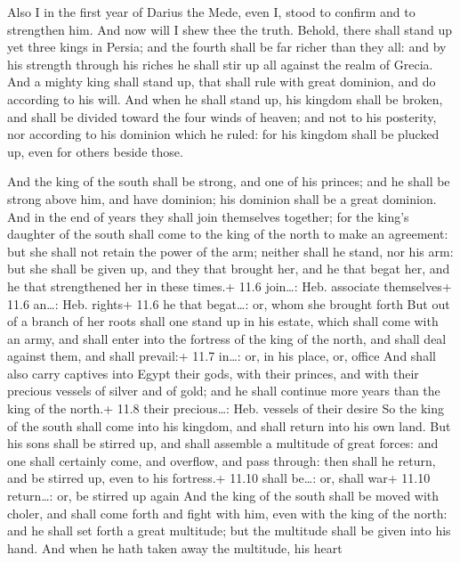 Also I in the first year of Darius the Mede, even I, stood
to confirm and to strengthen him.  And now will I shew thee
the truth. Behold, there shall stand up yet three kings in Persia; and
the fourth shall be far richer than they all: and by his strength
through his riches he shall stir up all against the realm of Grecia.
 And a mighty king shall stand up, that shall rule with
great dominion, and do according to his will.  And when he
shall stand up, his kingdom shall be broken, and shall be divided toward
the four winds of heaven; and not to his posterity, nor according to his
dominion which he ruled: for his kingdom shall be plucked up, even for
others beside those.

 And the king of the south shall be strong, and one of his
princes; and he shall be strong above him, and have dominion; his
dominion shall be a great dominion.  And in the end of years
they shall join themselves together; for the king's daughter of the
south shall come to the king of the north to make an agreement: but she
shall not retain the power of the arm; neither shall he stand, nor his
arm: but she shall be given up, and they that brought her, and he that
begat her, and he that strengthened her in these times.+ 11.6
join\ldots: Heb. associate themselves+ 11.6 an\ldots: Heb. rights+ 11.6
he that begat\ldots: or, whom she brought forth  But out of
a branch of her roots shall one stand up in his estate, which shall come
with an army, and shall enter into the fortress of the king of the
north, and shall deal against them, and shall prevail:+ 11.7 in\ldots:
or, in his place, or, office  And shall also carry captives
into Egypt their gods, with their princes, and with their precious
vessels of silver and of gold; and he shall continue more years than the
king of the north.+ 11.8 their precious\ldots: Heb. vessels of their
desire  So the king of the south shall come into his
kingdom, and shall return into his own land.  But his sons
shall be stirred up, and shall assemble a multitude of great forces: and
one shall certainly come, and overflow, and pass through: then shall he
return, and be stirred up, even to his fortress.+ 11.10 shall be\ldots:
or, shall war+ 11.10 return\ldots: or, be stirred up again 
And the king of the south shall be moved with choler, and shall come
forth and fight with him, even with the king of the north: and he shall
set forth a great multitude; but the multitude shall be given into his
hand.  And when he hath taken away the multitude, his heart
